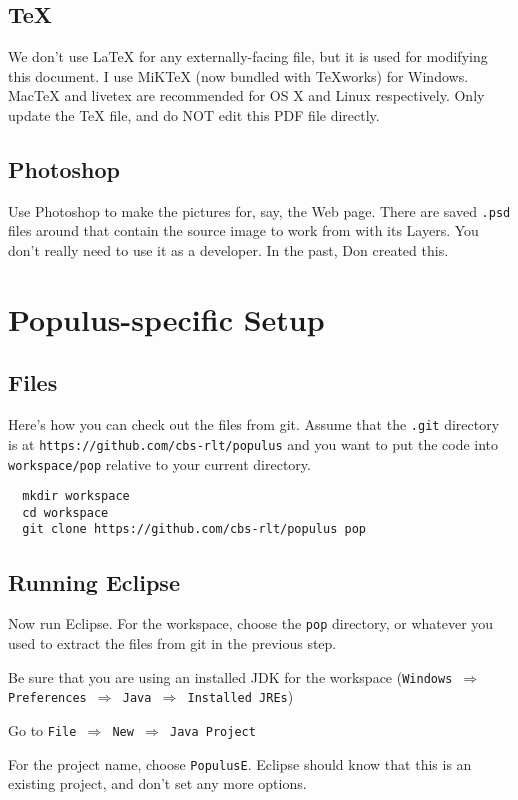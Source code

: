 \documentclass[12pt]{article}
\begin{document}
\subsection{TeX}
We don't use LaTeX for any externally-facing file, but it is used for modifying this document.  I use MiKTeX (now bundled with TeXworks) for Windows.  MacTeX and livetex are recommended for OS X and Linux respectively.  Only update the TeX file, and do NOT edit this PDF file directly.

\subsection{Photoshop}
Use Photoshop to make the pictures for, say, the Web page.  There are saved \texttt{.psd} files around that contain the source image to work from with its Layers.  You don't really need to use it as a developer.  In the past, Don created this.

\section{Populus-specific Setup}
\subsection{Files}

Here's how you can check out the files from git.  Assume that the \texttt{.git} directory is at \texttt{https://github.com/cbs-rlt/populus} and you want to put the code into \texttt{workspace/pop} relative to your current directory.

\begin{verbatim}
  mkdir workspace
  cd workspace
  git clone https://github.com/cbs-rlt/populus pop
\end{verbatim}

\subsection{Running Eclipse}
Now run Eclipse.  For the workspace, choose the \texttt{pop} directory, or whatever you used to extract the files from git in the previous step.

Be sure that you are using an installed JDK for the workspace (\texttt{Windows $\Rightarrow$ Preferences $\Rightarrow$ Java $\Rightarrow$ Installed JREs})

Go to \texttt{File $\Rightarrow$ New $\Rightarrow$ Java Project}


For the project name, choose \texttt{PopulusE}.  Eclipse should know that this is an existing project, and don't set any more options.
\end{document}
